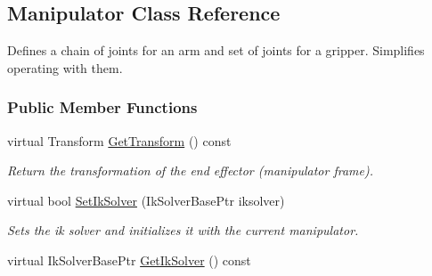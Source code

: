 \hypertarget{classOpenRAVE_1_1RobotBase_1_1Manipulator}{
\subsection{Manipulator Class Reference}
\label{classOpenRAVE_1_1RobotBase_1_1Manipulator}
}


Defines a chain of joints for an arm and set of joints for a gripper. Simplifies operating with them.  


\subsubsection*{Public Member Functions}
\begin{DoxyCompactItemize}
\item 
virtual Transform \hyperlink{classOpenRAVE_1_1RobotBase_1_1Manipulator_a2206c7317f62f083c3f57868ba82bfee}{GetTransform} () const 
\begin{DoxyCompactList}\small\item\em Return the transformation of the end effector (manipulator frame). \item\end{DoxyCompactList}\item 
virtual bool \hyperlink{classOpenRAVE_1_1RobotBase_1_1Manipulator_ae2b496857b0c5970bf0544e938e96125}{SetIkSolver} (IkSolverBasePtr iksolver)
\begin{DoxyCompactList}\small\item\em Sets the ik solver and initializes it with the current manipulator. \item\end{DoxyCompactList}\item 
\hypertarget{classOpenRAVE_1_1RobotBase_1_1Manipulator_a9ada1e961494800a5feae0672896f797}{
virtual IkSolverBasePtr \hyperlink{classOpenRAVE_1_1RobotBase_1_1Manipulator_a9ada1e961494800a5feae0672896f797}{GetIkSolver} () const }
\label{classOpenRAVE_1_1RobotBase_1_1Manipulator_a9ada1e961494800a5feae0672896f797}


\end{DoxyCompactItemize}

